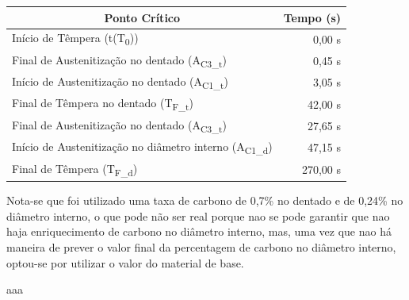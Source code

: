 \begin{table}[htb]
    \centering
    \label{tab:pontos_sim}
    \begin{tabular}{lr} 
    \toprule
    \multicolumn{1}{c}{\textbf{Ponto Crítico}}            & \multicolumn{1}{c}{\textbf{Tempo (s)}}                         \\ 
    \hline\hline
    Início de Têmpera (t(T\textsubscript{0}))                             & 0,00 s                                         \\ 
    \hline
    Final de Austenitização no dentado (A\textsubscript{C3\_t})           & 0,45 s                                         \\
    Início de Austenitização no dentado (A\textsubscript{C1\_t})          & 3,05 s                                         \\
    Final de Têmpera no dentado (T\textsubscript{F\_t})                   & 42,00 s                                        \\ 
    \hline\hline
    Final de Austenitização no dentado (A\textsubscript{C3\_t})           & 27,65 s                                        \\
    Início de Austenitização no diâmetro interno (A\textsubscript{C1\_d}) & 47,15 s                                        \\ 
    Final de Têmpera (T\textsubscript{F\_d})                              & 270,00 s                                       \\
    \bottomrule
    \end{tabular}
\end{table}
\par Nota-se que foi utilizado uma taxa de carbono de 0,7\% no dentado e de 0,24\% no diâmetro interno, o que pode não ser real porque nao se pode garantir que nao haja enriquecimento de carbono no diâmetro interno, mas, uma vez que nao há maneira de prever o valor final da percentagem de carbono no diâmetro interno, optou-se por utilizar o valor do material de base.
\par
aaa